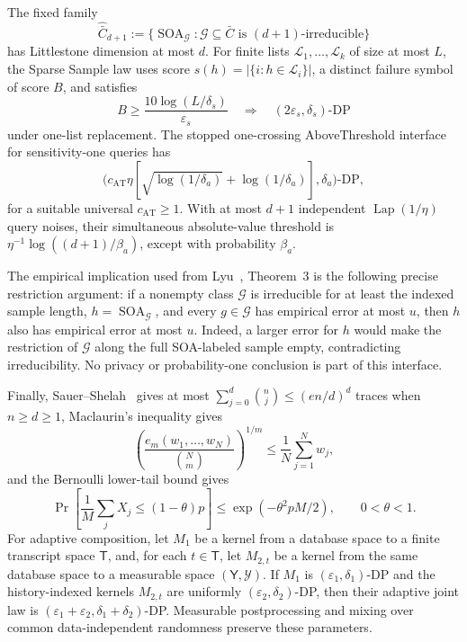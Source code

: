 \begin{proposition}
The fixed family
\[
 \widehat{\bar C}_{d+1}:=
 \{\operatorname{SOA}_{\mathcal G}:\mathcal G\subseteq\bar C
       \text{ is }(d+1)\text{-irreducible}\}
 \tag{C3}
\]
has Littlestone dimension at most \(d\). For finite lists
\(\mathcal L_1,\ldots,\mathcal L_k\) of size at most \(L\), the Sparse
Sample law uses score \(s(h)=|\{i:h\in\mathcal L_i\}|\), a distinct failure
symbol of score \(B\), and satisfies
\[
 B\geq\frac{10\log(L/\delta_s)}{\varepsilon_s}
 \quad\Longrightarrow\quad
 (2\varepsilon_s,\delta_s)\text{-DP}
 \tag{C4}
\]
under one-list replacement. The stopped one-crossing AboveThreshold
interface for sensitivity-one queries has
\[
 \bigl(c_{\mathrm{AT}}\eta
 [\sqrt{\log(1/\delta_a)}+\log(1/\delta_a)],
 \delta_a\bigr)\text{-DP},
 \tag{C5}
\]
for a suitable universal \(c_{\mathrm{AT}}\ge1\). With at most \(d+1\)
independent \(\operatorname{Lap}(1/\eta)\) query noises, their simultaneous
absolute-value threshold is
\(\eta^{-1}\log((d+1)/\beta_a)\), except with probability \(\beta_a\).

The empirical implication used from Lyu~\citep{lyu2025}, Theorem~3 is the
following precise restriction argument: if a nonempty class \(\mathcal G\)
is irreducible for at least the indexed sample length,
\(h=\operatorname{SOA}_{\mathcal G}\), and every \(g\in\mathcal G\) has
empirical error at most \(u\), then \(h\) also has empirical error at most
\(u\). Indeed, a larger error for \(h\) would make the restriction of
\(\mathcal G\) along the full SOA-labeled sample empty, contradicting
irreducibility. No privacy or probability-one conclusion is part of this
interface.

Finally, Sauer--Shelah~\citep{sauer1972} gives at most
\(\sum_{j=0}^d\binom nj\le(en/d)^d\) traces when \(n\ge d\ge1\),
Maclaurin's inequality gives
\[
 \left(\frac{e_m(w_1,\ldots,w_N)}{\binom Nm}\right)^{1/m}
 \le\frac1N\sum_{j=1}^Nw_j,
 \tag{C6}
\]
and the Bernoulli lower-tail bound gives
\[
 \Pr\!\left[\frac1M\sum_jX_j\le(1-\theta)p\right]
 \le\exp(-\theta^2pM/2),
 \qquad 0<\theta<1.
 \tag{C7}
\]
For adaptive composition, let \(M_1\) be a kernel from a database space to a finite transcript
space \(\mathsf T\), and, for each \(t\in\mathsf T\), let \(M_{2,t}\) be a
kernel from the same database space to a measurable space
\((\mathsf Y,\mathcal Y)\). If \(M_1\) is
\((\varepsilon_1,\delta_1)\)-DP and the history-indexed kernels
\(M_{2,t}\) are uniformly \((\varepsilon_2,\delta_2)\)-DP, then their
adaptive joint law is
\((\varepsilon_1+\varepsilon_2,\delta_1+\delta_2)\)-DP. Measurable
postprocessing and mixing over common data-independent randomness preserve
these parameters.
\end{proposition}

